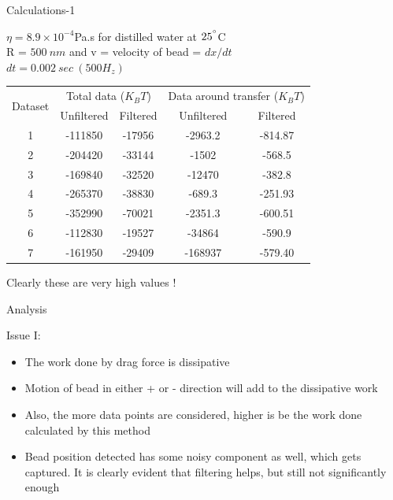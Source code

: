 \documentclass{beamer}
\begin{document}
\begin{frame}{Calculations-1}

$\eta=8.9 \times 10^{-4}$Pa.s for distilled water at $25^{\degree}$C\\
R = $500~nm$ and v = velocity of bead = $dx/dt$\\ $dt=0.002~sec~(500 H_z)$
\begin{table}
  \begin{tabular}{|c|c|c|c|c|}
    \hline
    \multirow{2}{*}{Dataset} &
      \multicolumn{2}{c|}{Total data ($K_BT$)} &
      \multicolumn{2}{c|}{Data around transfer ($K_BT$)} \\
      
    & Unfiltered & Filtered & Unfiltered & Filtered \\
    \hline
    1 & -111850 & -17956 & -2963.2 & -814.87  \\
    \hline
    2 & -204420 & -33144 & -1502 & -568.5  \\
    \hline
    3 & -169840 & -32520 & -12470 & -382.8  \\
    \hline
    4 & -265370 & -38830 & -689.3 & -251.93  \\
    \hline
    5 & -352990 & -70021 & -2351.3 & -600.51  \\
    \hline
    6 & -112830 & -19527 & -34864 & -590.9  \\
    \hline
    7 & -161950 & -29409 & -168937 & -579.40  \\
    \hline
  \end{tabular}
\end{table}
Clearly these are very high values !

\end{frame}
\begin{frame}{Analysis}

Issue I:
\begin{itemize}
\item The work done by drag force is dissipative
\item Motion of bead in either + or - direction will add to the dissipative work
\item Also, the more data points are considered, higher is be the work done calculated by this method
\item Bead position detected has some noisy component as well, which gets captured. It is clearly evident that filtering helps, but still not significantly enough
\end{itemize}


\end{frame}
\end{document}
